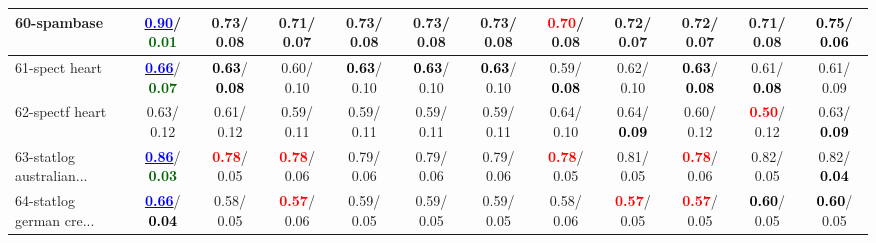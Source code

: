 \begin{table}[h]
\begin{center}
{\begin{tabular}{lc|c|c|c|c|c|c|c|c|c|c}
60-spambase & \underline{\textcolor{blue}{\textbf{  0.90}}}/\textcolor{darkgreen}{\textbf{  0.01}} &   0.73/  0.08 &   0.71/  0.07 &   0.73/  0.08 &   0.73/  0.08 &   0.73/  0.08 & \textcolor{red}{\textbf{  0.70}}/  0.08 &   0.72/  0.07 &   0.72/  0.07 &   0.71/  0.08 & \textcolor{black}{\textbf{  0.75}}/\textcolor{black}{\textbf{  0.06}} \\ \hline
61-spect heart & \underline{\textcolor{blue}{\textbf{  0.66}}}/\textcolor{darkgreen}{\textbf{  0.07}} & \textcolor{black}{\textbf{  0.63}}/\textcolor{black}{\textbf{  0.08}} &   0.60/  0.10 & \textcolor{black}{\textbf{  0.63}}/  0.10 & \textcolor{black}{\textbf{  0.63}}/  0.10 & \textcolor{black}{\textbf{  0.63}}/  0.10 &   0.59/\textcolor{black}{\textbf{  0.08}} &   0.62/  0.10 & \textcolor{black}{\textbf{  0.63}}/\textcolor{black}{\textbf{  0.08}} &   0.61/\textcolor{black}{\textbf{  0.08}} &   0.61/  0.09 \\
62-spectf heart &   0.63/  0.12 &   0.61/  0.12 &   0.59/  0.11 &   0.59/  0.11 &   0.59/  0.11 &   0.59/  0.11 &   0.64/  0.10 &   0.64/\textcolor{black}{\textbf{  0.09}} &   0.60/  0.12 & \textcolor{red}{\textbf{  0.50}}/  0.12 &   0.63/\textcolor{black}{\textbf{  0.09}} \\
63-statlog australian... & \underline{\textcolor{blue}{\textbf{  0.86}}}/\textcolor{darkgreen}{\textbf{  0.03}} & \textcolor{red}{\textbf{  0.78}}/  0.05 & \textcolor{red}{\textbf{  0.78}}/  0.06 &   0.79/  0.06 &   0.79/  0.06 &   0.79/  0.06 & \textcolor{red}{\textbf{  0.78}}/  0.05 &   0.81/  0.05 & \textcolor{red}{\textbf{  0.78}}/  0.06 &   0.82/  0.05 &   0.82/\textcolor{black}{\textbf{  0.04}} \\
64-statlog german cre... & \underline{\textcolor{blue}{\textbf{  0.66}}}/\textcolor{black}{\textbf{  0.04}} &   0.58/  0.05 & \textcolor{red}{\textbf{  0.57}}/  0.06 &   0.59/  0.05 &   0.59/  0.05 &   0.59/  0.05 &   0.58/  0.06 & \textcolor{red}{\textbf{  0.57}}/  0.05 & \textcolor{red}{\textbf{  0.57}}/  0.05 & \textcolor{black}{\textbf{  0.60}}/  0.05 & \textcolor{black}{\textbf{  0.60}}/  0.05 \\\end{tabular}}\label{stratsBalAcc1aCIELM}
\end{center}
\end{table}
